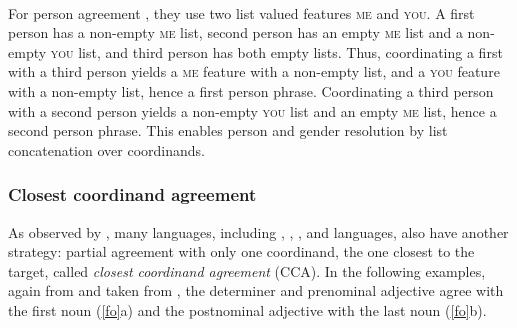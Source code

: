 \eas
\label{aguila}
 \impl\\
\zs
 
 \noindent
For person agreement , they use two list valued features \textsc{me} and \textsc{you}. A first person has a non-empty \textsc{me} list, second person has an empty \textsc{me} list and a non-empty \textsc{you} list, and third person has both empty lists.  Thus, coordinating a first with a third person yields a \textsc{me} feature with a non-empty list, and a \textsc{you} feature with a non-empty list, hence a first person phrase. Coordinating a third person with a second person yields a non-empty \textsc{you} list  and an empty \textsc{me} list, hence a second person phrase. This enables person and gender resolution by list concatenation over
coordinands. 

\subsubsection{Closest coordinand agreement}


As observed by \citet[186]{Corbet91}, many languages, including , , , and  languages, also have another strategy: partial agreement with only one coordinand, the one closest to the target, called \emph{closest coordinand agreement} (CCA). 
In the following examples, again from  and taken from , the determiner and prenominal adjective agree with the first noun (\ref{fo}a) and the postnominal adjective with the last noun (\ref{fo}b).

